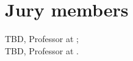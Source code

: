 
\chapter*{Jury members}

\noindent \textsc{TBD}, Professor at ;\\

\noindent \textsc{TBD}, Professor at . \\
